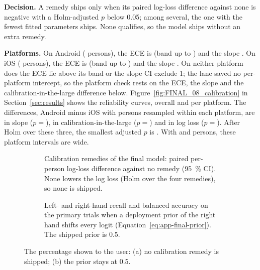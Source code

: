 \textbf{Decision.}
A remedy ships only when its paired log-loss difference against none is negative with a Holm-adjusted $p$ below 0.05; among several, the one with the fewest fitted parameters ships.
None qualifies, so the model ships without an extra remedy.

\textbf{Platforms.}
On Android ( persons), the ECE is  (band up to ) and the slope .
On iOS ( persons), the ECE is  (band up to ) and the slope .
On neither platform does the ECE lie above its band or the slope CI exclude 1; the lane saved no per-platform intercept, so the platform check rests on the ECE, the slope and the calibration-in-the-large difference below.
Figure~\ref{fig:FINAL_08_calibration} in Section~\ref{sec:results} shows the reliability curves, overall and per platform.
The differences, Android minus iOS with persons resampled within each platform, are  in slope ($p = {}$),  in calibration-in-the-large ($p = {}$) and  in log loss ($p = {}$).
After Holm over these three, the smallest adjusted $p$ is .
With  and  persons, these platform intervals are wide.

\begin{figure}[htbp]
  \centering
  \begin{subfigure}[t]{0.49\linewidth}
    \centering
    \caption{Calibration remedies of the final model: paired per-person log-loss difference against no remedy (95~\% CI). None lowers the log loss (Holm over the four remedies), so none is shipped.}
    \label{fig:FINAL_09_remedies}\label{fig:app:final-remedies}
  \end{subfigure}\hfill
  \begin{subfigure}[t]{0.49\linewidth}
    \centering
    \caption{Left- and right-hand recall and balanced accuracy on the primary trials when a deployment prior of the right hand shifts every logit (Equation~\ref{eq:app-final-prior}). The shipped prior is 0.5.}
    \label{fig:FINAL_14_prior}\label{fig:app:final-prior}
  \end{subfigure}
  \caption{The percentage shown to the user: (a) no calibration remedy is shipped; (b) the prior stays at 0.5.}
\end{figure}

